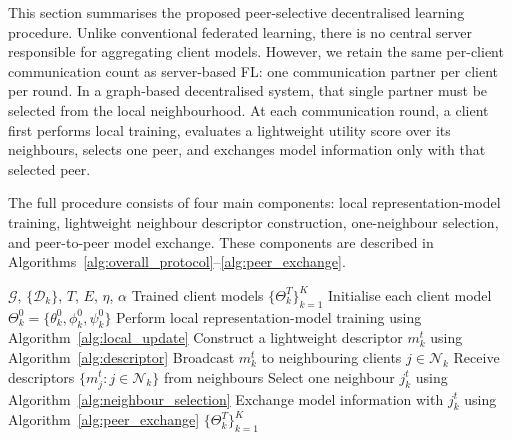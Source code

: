 \documentclass[conference]{IEEEtran}
\begin{document}
This section summarises the proposed peer-selective decentralised learning procedure. Unlike conventional federated learning, there is no central server responsible for aggregating client models. However, we retain the same per-client communication count as server-based FL: one communication partner per client per round. In a graph-based decentralised system, that single partner must be selected from the local neighbourhood. At each communication round, a client first performs local training, evaluates a lightweight utility score over its neighbours, selects one peer, and exchanges model information only with that selected peer.

The full procedure consists of four main components: local representation-model training, lightweight neighbour descriptor construction, one-neighbour selection, and peer-to-peer model exchange. These components are described in Algorithms~\ref{alg:overall_protocol}--\ref{alg:peer_exchange}.

\begin{algorithm}[t]
\caption{Peer-Selective Decentralised Representation Learning}
\label{alg:overall_protocol}
\footnotesize
\begin{algorithmic}[1]
\REQUIRE $\mathcal{G}$, $\{\mathcal{D}_k\}$, $T$, $E$, $\eta$, $\alpha$
\ENSURE Trained client models $\{\Theta_k^T\}_{k=1}^{K}$
\STATE Initialise each client model $\Theta_k^0=\{\theta_k^0,\phi_k^0,\psi_k^0\}$
        \STATE Perform local representation-model training using Algorithm~\ref{alg:local_update}
        \STATE Construct a lightweight descriptor $m_k^t$ using Algorithm~\ref{alg:descriptor}
        \STATE Broadcast $m_k^t$ to neighbouring clients $j\in\mathcal{N}_k$
    \ENDFOR
        \STATE Receive descriptors $\{m_j^t:j\in\mathcal{N}_k\}$ from neighbours
        \STATE Select one neighbour $j_k^t$ using Algorithm~\ref{alg:neighbour_selection}
        \STATE Exchange model information with $j_k^t$ using Algorithm~\ref{alg:peer_exchange}
    \ENDFOR
\ENDFOR
\RETURN $\{\Theta_k^T\}_{k=1}^{K}$
\end{algorithmic}
\end{algorithm} 
\end{document}
